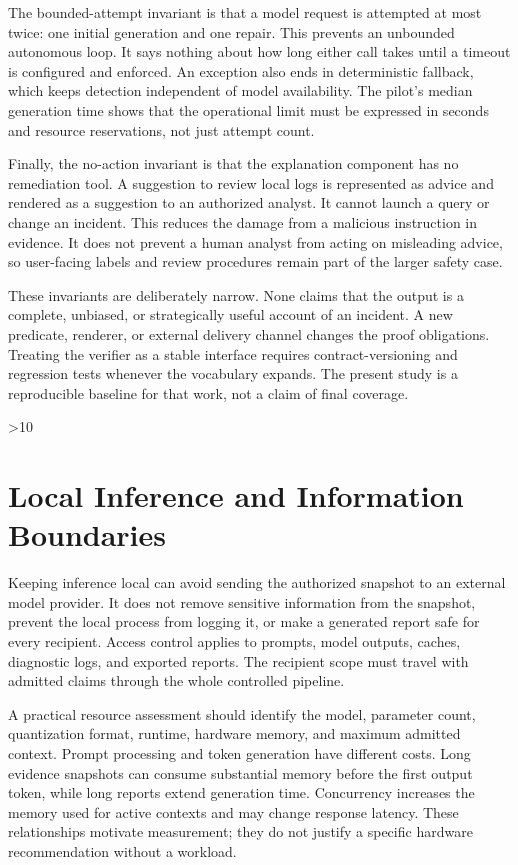 The bounded-attempt invariant is that a model request is attempted at most twice: one initial generation and one repair. This prevents an unbounded autonomous loop. It says nothing about how long either call takes until a timeout is configured and enforced. An exception also ends in deterministic fallback, which keeps detection independent of model availability. The pilot's median generation time shows that the operational limit must be expressed in seconds and resource reservations, not just attempt count.

Finally, the no-action invariant is that the explanation component has no remediation tool. A suggestion to review local logs is represented as advice and rendered as a suggestion to an authorized analyst. It cannot launch a query or change an incident. This reduces the damage from a malicious instruction in evidence. It does not prevent a human analyst from acting on misleading advice, so user-facing labels and review procedures remain part of the larger safety case.

These invariants are deliberately narrow. None claims that the output is a complete, unbiased, or strategically useful account of an incident. A new predicate, renderer, or external delivery channel changes the proof obligations. Treating the verifier as a stable interface requires contract-versioning and regression tests whenever the vocabulary expands. The present study is a reproducible baseline for that work, not a claim of final coverage.
\fi

\ifnum\variant>10
\section{Local Inference and Information Boundaries}
Keeping inference local can avoid sending the authorized snapshot to an external model provider. It does not remove sensitive information from the snapshot, prevent the local process from logging it, or make a generated report safe for every recipient. Access control applies to prompts, model outputs, caches, diagnostic logs, and exported reports. The recipient scope must travel with admitted claims through the whole controlled pipeline.

A practical resource assessment should identify the model, parameter count, quantization format, runtime, hardware memory, and maximum admitted context. Prompt processing and token generation have different costs. Long evidence snapshots can consume substantial memory before the first output token, while long reports extend generation time. Concurrency increases the memory used for active contexts and may change response latency. These relationships motivate measurement; they do not justify a specific hardware recommendation without a workload.

